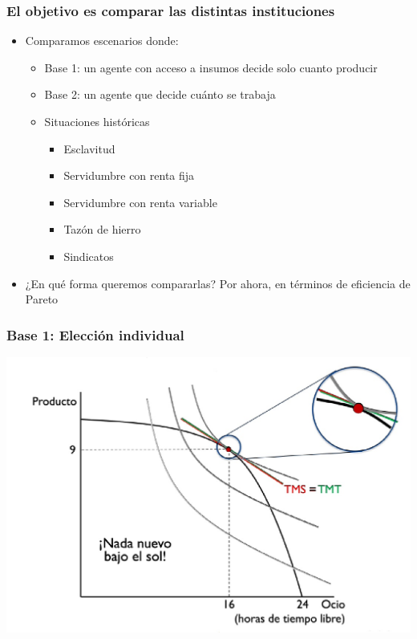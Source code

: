 \documentclass{beamer}
\begin{document}
\begin{frame}
\frametitle{ El objetivo es comparar las distintas instituciones}
\begin{itemize}
        \item Comparamos escenarios donde:
            \begin{itemize}
            \item Base 1: un agente con acceso a insumos decide solo cuanto producir
            \item Base 2: un agente que decide cuánto se trabaja
            \item Situaciones históricas
            \begin{itemize}
            \item Esclavitud
            \item Servidumbre con renta fija
            \item Servidumbre con renta variable
            \item Tazón de hierro
            \item Sindicatos
            \end{itemize}
        \end{itemize}
    \item ¿En qué forma queremos compararlas? Por ahora, en términos de eficiencia de Pareto
\end{itemize}
\end{frame}

\begin{frame}
\frametitle{ Base 1: Elección individual}
\centering
\includegraphics[scale=0.35]{Figures/Tema_04.6_modcap4.jpg}
\end{frame}
\end{document}
